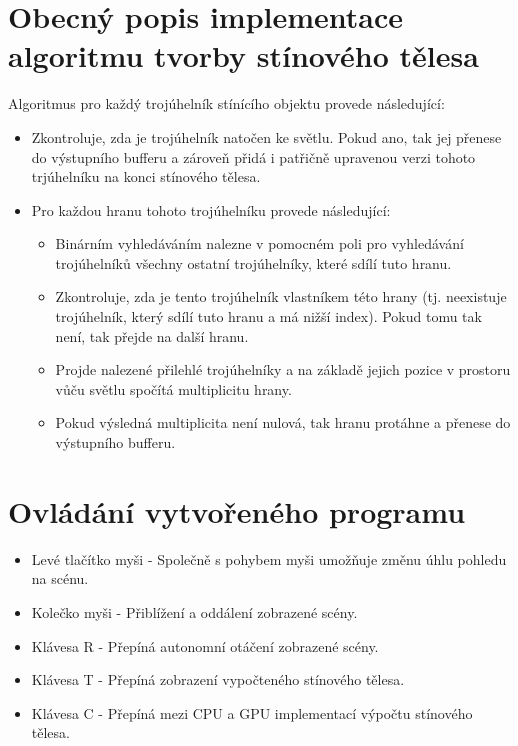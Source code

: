 \documentclass[11pt,a4paper]{article}
\begin{document}
\section{Obecný popis implementace algoritmu tvorby stínového tělesa}

Algoritmus pro každý trojúhelník stínícího objektu provede následující:
\begin{itemize}
	\item Zkontroluje, zda je trojúhelník natočen ke světlu. Pokud ano, tak jej přenese do výstupního bufferu a zároveň přidá i patřičně upravenou verzi tohoto trjúhelníku na konci stínového tělesa.
	\item Pro každou hranu tohoto trojúhelníku provede následující:
		\begin{itemize}
			\item Binárním vyhledáváním nalezne v pomocném poli pro vyhledávání trojúhelníků všechny ostatní trojúhelníky, které sdílí tuto hranu.
			\item Zkontroluje, zda je tento trojúhelník vlastníkem této hrany (tj. neexistuje trojúhelník, který sdílí tuto hranu a má nižší index). Pokud tomu tak není, tak přejde na další hranu.
			\item Projde nalezené přilehlé trojúhelníky a na základě jejich pozice v prostoru vůču světlu spočítá multiplicitu hrany. 
			\item Pokud výsledná multiplicita není nulová, tak hranu protáhne a přenese do výstupního bufferu.
		\end{itemize}
\end{itemize}

\section{Ovládání vytvořeného programu}

\begin{itemize}
	\item Levé tlačítko myši - Společně s pohybem myši umožňuje změnu úhlu pohledu na scénu.
	\item Kolečko myši - Přiblížení a oddálení zobrazené scény.
	\item Klávesa R - Přepíná autonomní otáčení zobrazené scény.
	\item Klávesa T - Přepíná zobrazení vypočteného stínového tělesa.
	\item Klávesa C - Přepíná mezi CPU a GPU implementací výpočtu stínového tělesa.
\end{itemize}
\end{document}
